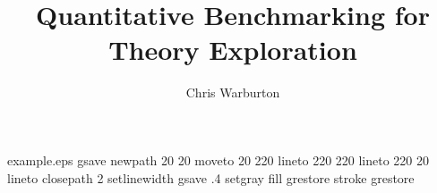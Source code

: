 %
%
\begin{filecontents*}{example.eps}
gsave
newpath
  20 20 moveto
  20 220 lineto
  220 220 lineto
  220 20 lineto
closepath
2 setlinewidth
gsave
  .4 setgray fill
grestore
stroke
grestore
\end{filecontents*}
%
\RequirePackage{fix-cm}
%
\documentclass[smallextended]{svjour3}       %
%
\smartqed  %
%
\usepackage{graphicx}
%
%

\usepackage{attrib}
\usepackage{csquotes}

\usepackage{graphicx}
\graphicspath{ {support/} }

%
%


\title{Quantitative Benchmarking for Theory Exploration%
}


\author{Chris Warburton%
}



